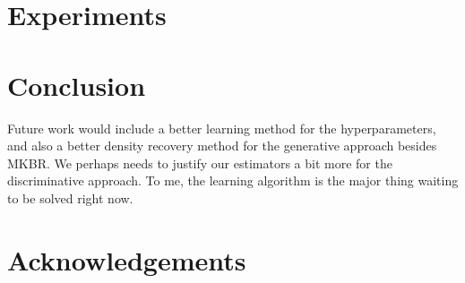 \documentclass[twoside]{article} \usepackage{aistats2017}
\newcommand{\warn}[1]{{\color{RedOrange} #1}}
\begin{document}
\section{Experiments}

\section{Conclusion}

	\warn{Future work would include a better learning method for the hyperparameters, and also a better density recovery method for the generative approach besides MKBR. We perhaps needs to justify our estimators a bit more for the discriminative approach. To me, the learning algorithm is the major thing waiting to be solved right now.}
	

\section*{Acknowledgements}



\end{document}
